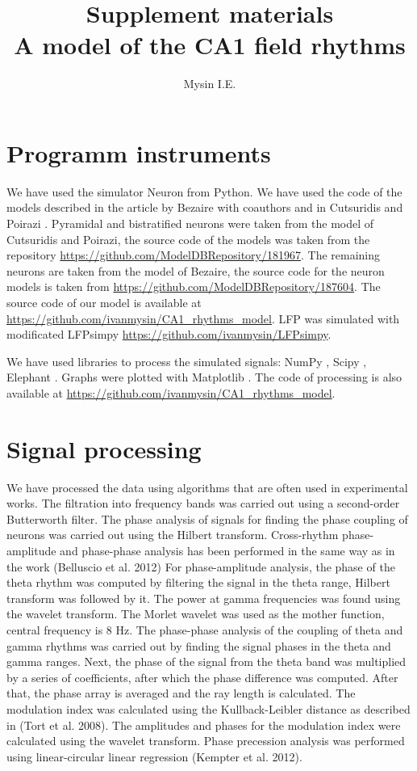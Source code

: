 \documentclass[a4paper,12pt]{article}
\title{Supplement materials \\[1ex] \large A model of the CA1 field rhythms}
\author{Mysin I.E.}
\date{}
\begin{document}
\maketitle

\section{Programm instruments}
We have used the simulator Neuron from Python. We have used the code of the models described in the article by Bezaire with coauthors \cite{bezaire_interneuronal_2016} and in Cutsuridis and Poirazi \cite{cutsuridis_computational_2015}. Pyramidal and bistratified neurons were taken from the model of Cutsuridis and Poirazi, the source code of the models was taken from the repository \url{https://github.com/ModelDBRepository/181967}. The remaining neurons are taken from the model of Bezaire, the source code for the neuron models is taken from \url{https://github.com/ModelDBRepository/187604}. The source code of our model is available at \url{https://github.com/ivanmysin/CA1\_rhythms\_model}. LFP was simulated with modificated LFPsimpy \url{https://github.com/ivanmysin/LFPsimpy}. \par
We have used libraries to process the simulated signals: NumPy \cite{2020NumPyArray}, Scipy \cite{2020SciPy-NMeth}, Elephant \cite{elephant18}. Graphs were plotted with Matplotlib \cite{Hunter_2007}. The code of processing is also available at \url{https://github.com/ivanmysin/CA1\_rhythms\_model}. 

\section{Signal processing}
We have processed the data using algorithms that are often used in experimental works. The filtration into frequency bands was carried out using a second-order Butterworth filter. The phase analysis of signals for finding the phase coupling of neurons was carried out using the Hilbert transform.
Cross-rhythm phase-amplitude and phase-phase analysis has been performed in the same way as in the work (Belluscio et al. 2012) For phase-amplitude analysis, the phase of the theta rhythm was computed by filtering the signal in the theta range, Hilbert transform was followed by it. The power at gamma frequencies was found using the wavelet transform. The Morlet wavelet was used as the mother function, central frequency is 8 Hz. The phase-phase analysis of the coupling of theta and gamma rhythms was carried out by finding the signal phases in the theta and gamma ranges. Next, the phase of the signal from the theta band was multiplied by a series of coefficients, after which the phase difference was computed. After that, the phase array is averaged and the ray length is calculated. The modulation index was calculated using the Kullback-Leibler distance as described in (Tort et al. 2008). The amplitudes and phases for the modulation index were calculated using the wavelet transform.
Phase precession analysis was performed using linear-circular linear regression (Kempter et al. 2012).
\end{document}
